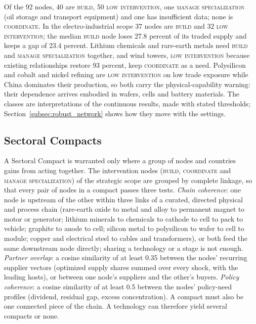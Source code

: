 Of the 92 nodes, 40 are \textsc{build}, 50 \textsc{low intervention}, one \textsc{manage
specialization} (oil storage and transport equipment) and one has insufficient data; none is
\textsc{coordinate}. In the electro-industrial scope 37 nodes are \textsc{build} and 32 \textsc{low
intervention}; the median \textsc{build} node loses 27.8 percent of its traded supply and keeps a gap of
23.4 percent. Lithium chemicals and rare-earth metals need \textsc{build} and \textsc{manage
specialization} together, and wind towers, \textsc{low intervention} because existing relationships
restore 93 percent, keep \textsc{coordinate} as a need. Polysilicon and cobalt and nickel refining are
\textsc{low intervention} on low trade exposure while China dominates their production, so both carry
the physical-capability warning: their dependence arrives embodied in wafers, cells and battery
materials. The classes are interpretations of the continuous results, made with stated thresholds;
Section~\ref{subsec:robust_network} shows how they move with the settings.

\subsection{Sectoral Compacts}
\label{subsec:aib_compacts}

A Sectoral Compact is warranted only where a group of nodes and countries gains from acting together.
The intervention nodes (\textsc{build}, \textsc{coordinate} and \textsc{manage specialization}) of the
strategic scope are grouped by complete linkage, so that every pair of nodes in a compact passes three
tests. \emph{Chain coherence}: one node is upstream of the other within three links of a curated,
directed physical and process chain (rare-earth oxide to metal and alloy to permanent magnet to motor
or generator; lithium minerals to chemicals to cathode to cell to pack to vehicle; graphite to anode to
cell; silicon metal to polysilicon to wafer to cell to module; copper and electrical steel to cables
and transformers), or both feed the same downstream node directly; sharing a technology or a stage is
not enough. \emph{Partner overlap}: a cosine similarity of at least 0.35 between the nodes' recurring
supplier vectors (optimized supply shares summed over every shock, with the leading hosts), or
between one node's suppliers and the other's buyers. \emph{Policy coherence}: a cosine similarity of at
least 0.5 between the nodes' policy-need profiles (dividend, residual gap, excess concentration). A
compact must also be one connected piece of the chain. A technology can therefore yield several
compacts or none.

